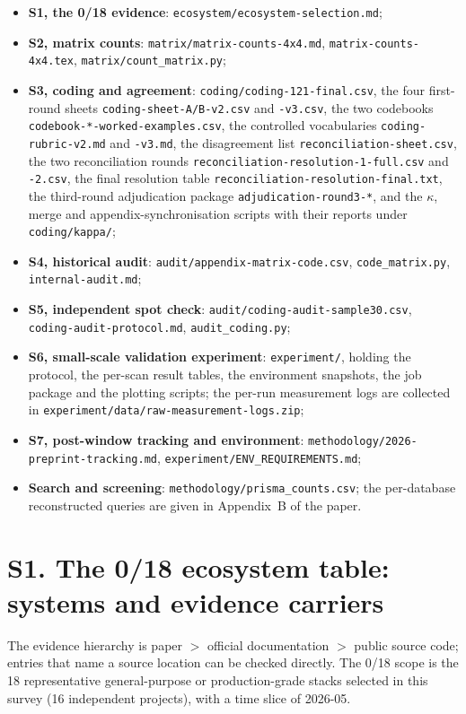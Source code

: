 \documentclass[11pt,a4paper]{article}
\begin{document}
\begin{itemize}[leftmargin=2em,itemsep=1pt]
  \item \textbf{S1, the 0/18 evidence}: \texttt{ecosystem/ecosystem-selection.md};
  \item \textbf{S2, matrix counts}: \texttt{matrix/matrix-counts-4x4.md},
    \texttt{matrix-counts-4x4.tex}, \texttt{matrix/count\_matrix.py};
  \item \textbf{S3, coding and agreement}: \texttt{coding/coding-121-final.csv},
    the four first-round sheets \texttt{coding-sheet-A/B-v2.csv} and
    \texttt{-v3.csv}, the two codebooks
    \texttt{codebook-*-worked-examples.csv}, the controlled vocabularies
    \texttt{coding-rubric-v2.md} and \texttt{-v3.md}, the disagreement list
    \texttt{reconciliation-sheet.csv}, the two reconciliation rounds
    \texttt{reconciliation-resolution-1-full.csv} and \texttt{-2.csv}, the
    final resolution table \texttt{reconciliation-resolution-final.txt}, the
    third-round adjudication package \texttt{adjudication-round3-*}, and the
    $\kappa$, merge and appendix-synchronisation scripts with their reports
    under \texttt{coding/kappa/};
  \item \textbf{S4, historical audit}: \texttt{audit/appendix-matrix-code.csv},
    \texttt{code\_matrix.py}, \texttt{internal-audit.md};
  \item \textbf{S5, independent spot check}: \texttt{audit/coding-audit-sample30.csv},
    \texttt{coding-audit-protocol.md}, \texttt{audit\_coding.py};
  \item \textbf{S6, small-scale validation experiment}: \texttt{experiment/},
    holding the protocol, the per-scan result tables, the environment
    snapshots, the job package and the plotting scripts; the per-run
    measurement logs are collected in
    \texttt{experiment/data/raw-measurement-logs.zip};
  \item \textbf{S7, post-window tracking and environment}:
    \texttt{methodology/2026-preprint-tracking.md},
    \texttt{experiment/ENV\_REQUIREMENTS.md};
  \item \textbf{Search and screening}: \texttt{methodology/prisma\_counts.csv};
    the per-database reconstructed queries are given in Appendix~B of the paper.
\end{itemize}

\section{S1. The 0/18 ecosystem table: systems and evidence carriers}
The evidence hierarchy is paper $>$ official documentation $>$ public source code; entries that name a source location can be checked directly. The 0/18 scope is the 18 representative general-purpose or production-grade stacks selected in this survey (16 independent projects), with a time slice of 2026-05.
\end{document}
